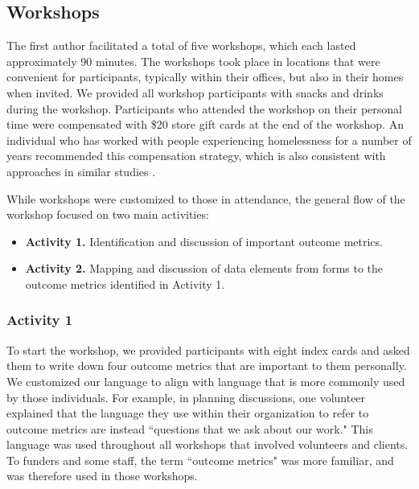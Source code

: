 \subsection{Workshops}
The first author facilitated a total of five workshops, which each lasted approximately 90 minutes. The workshops took place in locations that were convenient for participants, typically within their offices, but also in their homes when invited. We provided all workshop participants with snacks and drinks during the workshop. Participants who attended the workshop on their personal time were compensated with \$20 store gift cards at the end of the workshop. An individual who has worked with people experiencing homelessness for a number of years recommended this compensation strategy, which is also consistent with approaches in similar studies \citep{LeDantec2008Dignity}.

While workshops were customized to those in attendance, the general flow of the workshop focused on two main activities:

\begin{itemize}
\item \textbf{Activity 1.} Identification and discussion of important outcome metrics.
\item \textbf{Activity 2.} Mapping and discussion of data elements from forms to the outcome metrics identified in Activity 1.
\end{itemize}

\subsubsection{Activity 1}
To start the workshop, we provided participants with eight index cards and asked them to write down four outcome metrics that are important to them personally. We customized our language to align with language that is more commonly used by those individuals. For example, in planning discussions, one volunteer explained that the language they use within their organization to refer to outcome metrics are instead ``questions that we ask about our work." This language was used throughout all workshops that involved volunteers and clients. To funders and some staff, the term ``outcome metrics" was more familiar, and was therefore used in those workshops.

